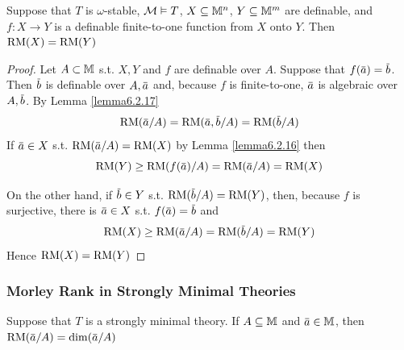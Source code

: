 \documentclass[11pt]{article}
\begin{document}
\begin{corollary}[]
Suppose that \(T\) is \(\omega\)-stable, \(\mathcal{M}\vDash T\), \(X\subseteq\mathbb{M}^n\), \(Y\subseteq\mathbb{M}^m\) are definable, and \(f:X\to Y\) is a
definable finite-to-one function from \(X\) onto \(Y\). Then \(\operatorname{RM}(X)=\operatorname{RM}(Y)\)
\end{corollary}

\begin{proof}
Let \(A\subset\mathbb{M}\) s.t. \(X,Y\) and \(f\) are definable over \(A\). Suppose that \(f(\bara)=\barb\).
Then \(\barb\) is definable over \(A,\bara\) and, because \(f\) is finite-to-one, \(\bara\) is
algebraic over \(A,\barb\). By Lemma \ref{lemma6.2.17}
\begin{equation*}
\RM(\bara/A)=\RM(\bara,\barb/A)=\RM(\barb/A)
\end{equation*}
If \(\bara\in X\) s.t. \(\RM(\bara/A)=\RM(X)\) by Lemma \ref{lemma6.2.16} then
\begin{equation*}
\RM(Y)\ge\RM(f(\bara)/A)=\RM(\bara/A)=\RM(X)
\end{equation*}

On the other hand, if \(\barb\in Y\) s.t. \(\RM(\barb/A)=\RM(Y)\), then, because \(f\) is
surjective, there is \(\bara\in X\) s.t. \(f(\bara)=\barb\) and
\begin{equation*}
\RM(X)\ge\RM(\bara/A)=\RM(\barb/A)=\RM(Y)
\end{equation*}
Hence \(\operatorname{RM}(X)=\operatorname{RM}(Y)\)
\end{proof}
\subsubsection{Morley Rank in Strongly Minimal Theories}
\label{sec:org942d615}
\begin{theorem}[]
Suppose that \(T\) is a strongly minimal theory. If \(A\subseteq\mathbb{M}\) and \(\bara\in\M\), then \(\RM(\bara/A)=\dim(\bara/A)\)
\end{theorem}
\end{document}
